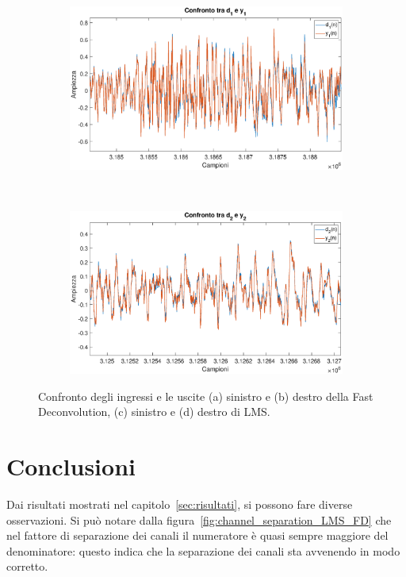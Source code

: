 \documentclass[12pt,a4paper,titlepage]{article}
\begin{document}
\begin{figure}[h]
	\ContinuedFloat
	\centering
	\begin{subfigure}{1\textwidth}
		\includegraphics[width=1\textwidth]{Immagini/d1_y1_LMS}
		\caption{}
		\label{fig:d1_y1_LMS}
	\end{subfigure}\\
	\begin{subfigure}{1\textwidth}
		\includegraphics[width=1\textwidth]{Immagini/d2_y2_LMS}
		\caption{}
		\label{fig:d2_y2_LMS}
	\end{subfigure}
	\caption{Confronto degli ingressi e le uscite (a) sinistro e (b) destro della Fast Deconvolution, (c) sinistro e (d) destro di LMS.}
	\label{fig:confronto_ingressi_uscite_LMS_FD}
\end{figure}


\clearpage

\section{Conclusioni}
\label{sec:conclusioni}
Dai risultati mostrati nel capitolo~\ref{sec:risultati}, si possono fare diverse osservazioni. Si può notare dalla figura~\ref{fig:channel_separation_LMS_FD} che nel fattore di separazione dei canali il numeratore è quasi sempre maggiore del denominatore: questo indica che la separazione dei canali sta avvenendo in modo corretto. 
\end{document}
